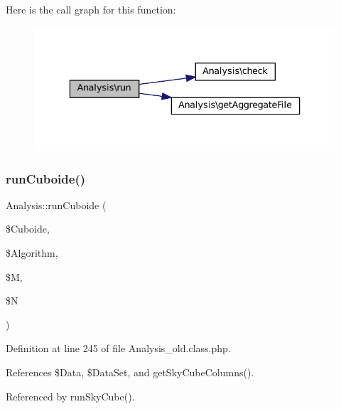 Here is the call graph for this function\+:\nopagebreak
\begin{figure}[H]
\begin{center}
\leavevmode
\includegraphics[width=336pt]{class_analysis_ac77d374d171fd92c5f693a04feff456b_cgraph}
\end{center}
\end{figure}
\mbox{\label{class_analysis_a9cda19ef90a12fd21523975730dd769d}} 
\subsubsection{\texorpdfstring{run\+Cuboide()}{runCuboide()}}
{\footnotesize\ttfamily Analysis\+::run\+Cuboide (\begin{DoxyParamCaption}\item[{}]{\$\+Cuboide,  }\item[{}]{\$\+Algorithm,  }\item[{}]{\$M,  }\item[{}]{\$N }\end{DoxyParamCaption})\hspace{0.3cm}{\ttfamily [protected]}}



Definition at line 245 of file Analysis\+\_\+old.\+class.\+php.



References \$\+Data, \$\+Data\+Set, and get\+Sky\+Cube\+Columns().



Referenced by run\+Sky\+Cube().

